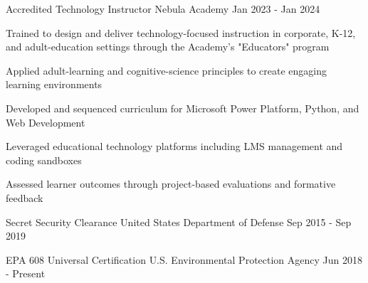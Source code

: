 
\begin{cventries}
    \cventry
    {Accredited Technology Instructor} %
    {Nebula Academy} %
    {Jan 2023 - Jan 2024} %
    {} %
    {
      \begin{cvitems} %
        \item {Trained to design and deliver technology-focused instruction in corporate, K-12, and adult-education settings through the Academy's "Educators" program}
        \item {Applied adult-learning and cognitive-science principles to create engaging learning environments}
        \item {Developed and sequenced curriculum for Microsoft Power Platform, Python, and Web Development}
        \item {Leveraged educational technology platforms including LMS management and coding sandboxes}
        \item {Assessed learner outcomes through project-based evaluations and formative feedback}
      \end{cvitems}
    }

    \cventry
    {Secret Security Clearance} %
    {United States Department of Defense} %
    {Sep 2015 - Sep 2019} %
    {} %
    {}

    \cventry
    {EPA 608 Universal Certification} %
    {U.S. Environmental Protection Agency} %
    {Jun 2018 - Present} %
    {} %
    {}
\end{cventries}

